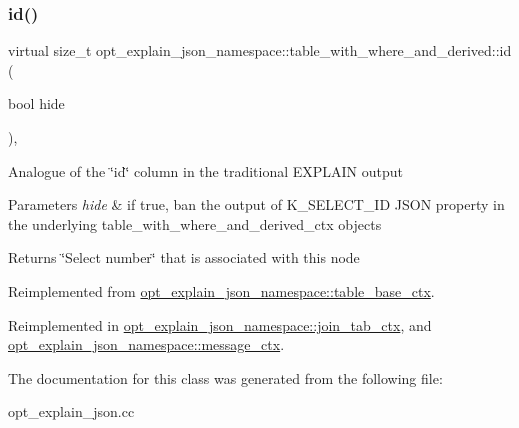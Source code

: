 \subsubsection{\texorpdfstring{id()}{id()}}
{\footnotesize\ttfamily virtual size\+\_\+t opt\+\_\+explain\+\_\+json\+\_\+namespace\+::table\+\_\+with\+\_\+where\+\_\+and\+\_\+derived\+::id (\begin{DoxyParamCaption}\item[{bool}]{hide }\end{DoxyParamCaption})\hspace{0.3cm}{\ttfamily [inline]}, {\ttfamily [virtual]}}

Analogue of the \char`\"{}id\char`\"{} column in the traditional E\+X\+P\+L\+A\+IN output


\begin{DoxyParams}{Parameters}
{\em hide} & if true, ban the output of K\+\_\+\+S\+E\+L\+E\+C\+T\+\_\+\+ID J\+S\+ON property in the underlying table\+\_\+with\+\_\+where\+\_\+and\+\_\+derived\+\_\+ctx objects\\
\hline
\end{DoxyParams}
\begin{DoxyReturn}{Returns}
\char`\"{}\+Select number\char`\"{} that is associated with this node 
\end{DoxyReturn}


Reimplemented from \mbox{\hyperlink{classopt__explain__json__namespace_1_1table__base__ctx_afc1c98638ff3c4cc5b33ef99164cb144}{opt\+\_\+explain\+\_\+json\+\_\+namespace\+::table\+\_\+base\+\_\+ctx}}.



Reimplemented in \mbox{\hyperlink{classopt__explain__json__namespace_1_1join__tab__ctx_a294e12d9416adb645ab30841bddda4e0}{opt\+\_\+explain\+\_\+json\+\_\+namespace\+::join\+\_\+tab\+\_\+ctx}}, and \mbox{\hyperlink{classopt__explain__json__namespace_1_1message__ctx_a76f2d4b59c3707aa67afef272d4a00ca}{opt\+\_\+explain\+\_\+json\+\_\+namespace\+::message\+\_\+ctx}}.



The documentation for this class was generated from the following file\+:\begin{DoxyCompactItemize}
\item 
opt\+\_\+explain\+\_\+json.\+cc\end{DoxyCompactItemize}
